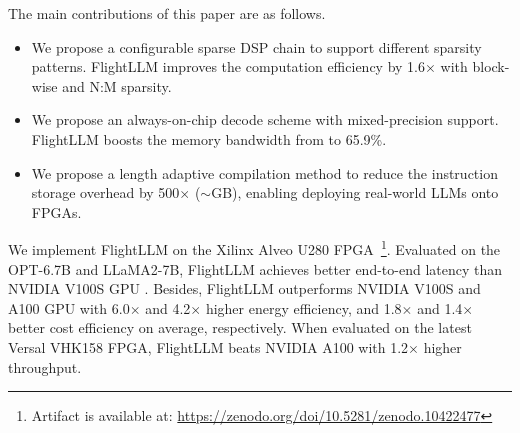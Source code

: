 The main contributions of this paper are as follows.
\begin{itemize}
    \item We propose a configurable sparse DSP chain to support different sparsity patterns. FlightLLM improves the computation efficiency by 1.6$\times$ with block-wise and N:M sparsity.
    \item We propose an always-on-chip decode scheme with mixed-precision support. FlightLLM boosts the memory bandwidth from  to 65.9\%.
    \item We propose a length adaptive compilation method to reduce the instruction storage overhead by 500$\times$ ($\sim$GB), enabling deploying real-world LLMs onto FPGAs.
\end{itemize}

We implement FlightLLM on the Xilinx Alveo U280 FPGA~\footnote{Artifact is available at: \url{https://zenodo.org/doi/10.5281/zenodo.10422477}}. Evaluated on the OPT-6.7B and LLaMA2-7B, FlightLLM achieves better end-to-end latency than NVIDIA V100S GPU . Besides, FlightLLM outperforms NVIDIA V100S and A100 GPU with 6.0$\times$ and 4.2$\times$ higher energy efficiency, and 1.8$\times$ and 1.4$\times$ better cost efficiency on average, respectively. When evaluated on the latest Versal VHK158 FPGA, FlightLLM beats NVIDIA A100 with 1.2$\times$ higher throughput. 